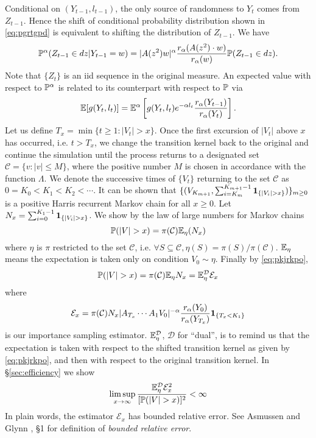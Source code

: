 Conditional on $(Y_{t-1}, l_{t-1})$, the only source of randomness to
$Y_t$ comes from $Z_{t-1}$. Hence the shift of conditional probability
distribution shown in \eqref{eq:pgrtgpd} is equivalent to shifting the
distribution of $Z_{t-1}$. We have
\[
\P^\alpha (Z_{t-1} \in dz | Y_{t-1} = w) = |A(z^2) w|^\alpha {
  r_\alpha(A(z^2) \cdot w) \over r_\alpha(w)
} \P(Z_{t-1} \in dz).
\]
Note that $\{Z_t\}$ is an iid sequence in the original measure.
An expected value with respect to $\P^\alpha$ is related to its
counterpart with respect to $\P$ via
\begin{equation}
  \label{eq:pkjrkpo}
  \E [g(Y_t, l_t)] = \E^\alpha \left[
    g(Y_t, l_t) e^{-\alpha l_t} {r_\alpha(Y_{t-1}) \over r_\alpha(Y_t)}
    \right].
\end{equation}
Let us define $T_x = \min\{t \geq 1: |V_t| > x\}$. 
Once the first excursion of $|V_t|$ above $x$ has occurred, i.e.
$t > T_x$, we change the transition kernel back to the original and
continue the simulation until the process returns to a designated set
$\mathcal C = \{v: |v| \leq M\}$, where
the positive number $M$ is chosen in accordance with the function
$\Lambda$. We denote the successive times of $\{V_t\}$ returning to the
set $\mathcal C$ as $0 = K_0  < K_1 < K_2 < \cdots$. It can be shown that
$\{(V_{K_{m+1}}, \sum_{i=K_m}^{K_{m+1} - 1} \1{|V_i| > x})\}_{m \geq 0}$
is a positive Harris recurrent Markov chain for all $x \geq 0$.
Let $N_x = \sum_{i=0}^{K_1 - 1} \1{|V_i| > x}$. We show by the law of large
numbers for Markov chains
\[
\P(|V| > x) = \pi(\mathcal C) \E_\eta(N_x)
\]
where $\eta$ is $\pi$ restricted to the set $\mathcal C$, i.e.
$\forall S \subseteq \mathcal C, \eta(S) = \pi(S)/\pi(\mathcal C)$.
$\E_\eta$ means the expectation is taken only on condition
$V_0 \sim \eta$. Finally by \eqref{eq:pkjrkpo},
\[
\P(|V| > x) = \pi(\mathcal C) \E_\eta N_x
= \E_\eta^{\mathcal D} \mathcal E_x
\]
where
\[
\mathcal E_x
=
\pi(\mathcal C)
N_x |A_{T_x} \cdots A_1 V_0|^{-\alpha}
{r_\alpha(Y_0) \over r_\alpha(Y_{T_x})}
\1{T_x < K_1}
\]
is our importance sampling estimator. $\E_\eta^{\mathcal D}$,
$\mathcal D$ for ``dual'', is to remind us that the expectation is
taken with respect to the shifted transition kernel as given by
\eqref{eq:pkjrkpo}, and then with respect to the original transition
kernel. In \S\ref{sec:efficiency} we show
\[
\limsup_{x \to \infty} {
  \E_\eta^{\mathcal D} \mathcal E_x^2
  \over
  [\P(|V| > x)]^2
} < \infty
\]
In plain words, the estimator $\mathcal E_x$ has bounded relative
error. See Asmussen and Glynn \cite{opac-b1123521}, \S 1 for
definition of {\em bounded relative error}.
